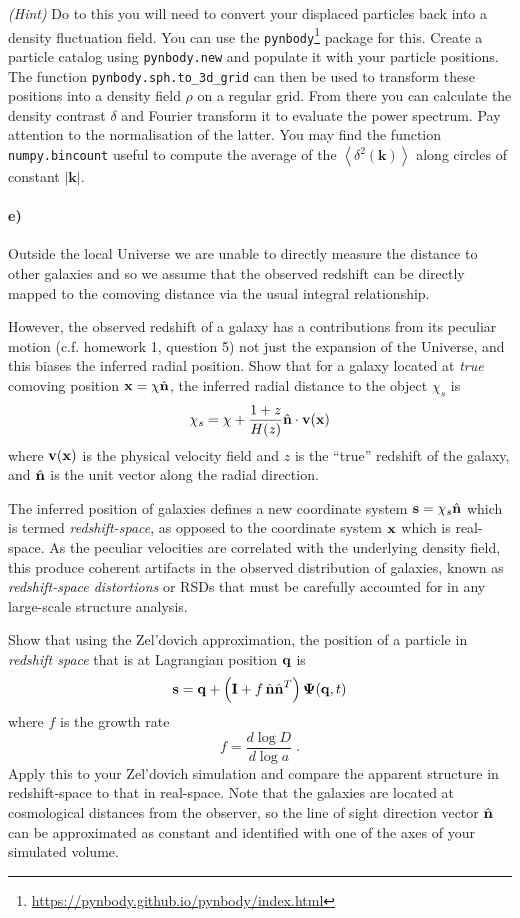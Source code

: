 \documentclass[12pt]{article}
\begin{document}
\emph{(Hint)} Do to this you will need to convert your displaced particles back
into a density fluctuation field. You can use the
\texttt{pynbody}\footnote{\url{https://pynbody.github.io/pynbody/index.html}}
package for this. Create a particle catalog using \texttt{pynbody.new} and
populate it with your particle positions. The function
\texttt{pynbody.sph.to\_3d\_grid} can then be used to transform these positions
into a density field $\rho$ on a regular grid. From there you can calculate the
density contrast $\delta$ and Fourier transform it to evaluate the power
spectrum. Pay attention to the normalisation of the latter. You may find the
function \texttt{numpy.bincount} useful to compute the average of the
$\left<\delta^2(\mathbf{k})\right>$ along circles of constant
$\left|\mathbf{k}\right|$.

\paragraph{e)} Outside the local Universe we are unable to directly measure the distance to other galaxies and so we assume that the observed redshift can be directly mapped to the comoving distance via the usual integral relationship.

However, the observed redshift of a galaxy has a contributions from its peculiar motion (c.f. homework 1, question 5) not just the expansion of the Universe, and this biases the inferred radial position. Show that for a galaxy located at \emph{true} comoving position ${\boldsymbol{\mathbf{x}}} = \chi \hat{{\boldsymbol{\mathbf{n}}}}$, the inferred radial distance to the object $\chi_s$ is
\begin{equation}
    \chi_s = \chi + \frac{1 + z}{H(z)}\hat{{\boldsymbol{\mathbf{n}}}} \cdot {\boldsymbol{\mathbf{v}}}({\boldsymbol{\mathbf{x}}})
\end{equation}
where ${\boldsymbol{\mathbf{v}}}({\boldsymbol{\mathbf{x}}})$ is the physical velocity field and $z$ is the ``true'' redshift of the galaxy, and $\hat{{\boldsymbol{\mathbf{n}}}}$ is the unit vector along the radial direction.

The inferred position of galaxies defines a new coordinate system ${\boldsymbol{\mathbf{s}}} = \chi_s \hat{{\boldsymbol{\mathbf{n}}}}$ which is termed \emph{redshift-space}, as opposed to the coordinate system ${\boldsymbol{\mathbf{x}}}$ which is real-space. As the peculiar velocities are correlated with the underlying density field, this produce coherent artifacts in the observed distribution of galaxies, known as \emph{redshift-space distortions} or RSDs that must be carefully accounted for in any large-scale structure analysis.

Show that using the Zel'dovich approximation, the position of a particle in \emph{redshift space} that is at Lagrangian position ${\boldsymbol{\mathbf{q}}}$ is
\begin{equation}
{\boldsymbol{\mathbf{s}}} = {\boldsymbol{\mathbf{q}}} + \left(\mathbf{I} + f \, \hat{{\boldsymbol{\mathbf{n}}}} \hat{{\boldsymbol{\mathbf{n}}}}^T\right) \mathbf{\Psi}({\boldsymbol{\mathbf{q}}}, t)
\end{equation}
where $f$ is the growth rate
\begin{equation}
f = \frac{d \log D}{d \log a} \; .
\end{equation}
Apply this to your Zel'dovich simulation and compare the apparent structure in redshift-space to that in real-space. Note that the galaxies are located at cosmological distances from the observer, so the line of sight direction vector $\hat{{\boldsymbol{\mathbf{n}}}}$ can be approximated as constant and identified with one of the axes of your simulated volume.
\end{document}
